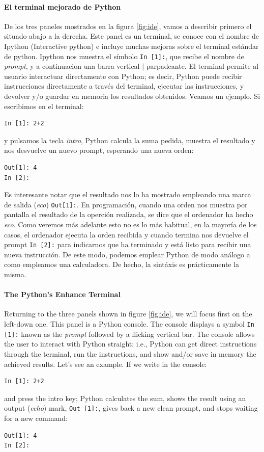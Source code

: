 \begin{paracol}{2}
\paragraph{El terminal mejorado de Python}
De los tres paneles mostrados en la figura \ref{fig:ide}, vamos a describir primero el situado abajo a la derecha. Este panel es un terminal, se conoce con el nombre de Ipython (Interactive python) e incluye muchas mejoras sobre el terminal estándar de python. Ipython nos muestra el símbolo \texttt{In [1]:}, que recibe el nombre de \emph{prompt}, y a continuacion una barra vertical $|$ parpadeante. El terminal permite al usuario interactuar directamente con Python; es decir, Python puede recibir instrucciones directamente a través del terminal, ejecutar las instrucciones, y devolver y/o guardar en memoria los resultados obtenidos.  Veamos un ejemplo. Si escribimos en el terminal:
\begin{verbatim}
In [1]: 2+2
\end{verbatim}
y pulsamos la tecla \emph{intro}, Python calcula la suma pedida, muestra el resultado y nos desvuelve un nuevo prompt, esperando una nueva orden:
\begin{verbatim}
Out[1]: 4
In [2]:
\end{verbatim}
Es interesante notar que el resultado nos lo ha mostrado empleando una marca de salida (\emph{eco}) \texttt{Out[1]:}. En programación, cuando una orden nos muestra por pantalla el resultado de la operción realizada, se dice que el ordenador ha hecho \emph{eco}. Como veremos más adelante esto no es lo más habitual, en la mayoría de los casos, el ordenador ejecuta la orden recibida y cuando termina nos devuelve el prompt \texttt{In [2]:} para indicarnos que ha terminado y está listo para recibir una nueva instrucción. De este modo, podemos emplear Python de modo análogo a como empleamos una calculadora. De hecho, la sintáxis es prácticamente la misma.
\switchcolumn
\paragraph{The Python's Enhance Terminal}
Returning to the three panels shown in figure \ref{fig:ide}, we will focus first on the left-down one. This panel is a Python console. The console displays a symbol \texttt{In [1]:} known as the \emph{prompt} followed by a flicking vertical bar. The console allows the user to interact with Python straight; i.e., Python can get direct instructions through the terminal, run the instructions, and show and/or save in memory the achieved results. Let's see an example. If we write in the console:
\begin{verbatim}
In [1]: 2+2
\end{verbatim}
and press the intro key; Python calculates the sum, shows the result using an output (\emph{echo}) mark,  \texttt{Out [1]:}, gives back a new clean prompt, and stops waiting for a new command:
\begin{verbatim}
Out[1]: 4
In [2]:
\end{verbatim}


\end{paracol}

